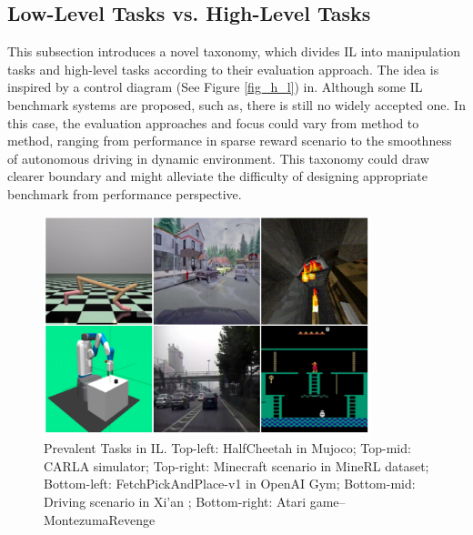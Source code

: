 \documentclass[acmsmall]{acmart}
\begin{document}
\subsection{Low-Level Tasks vs. High-Level Tasks} 
This subsection introduces a novel taxonomy, which divides IL into manipulation tasks and high-level tasks according to their evaluation approach. The idea is inspired by a control diagram (See Figure \ref{fig_h_l}) in\cite{osaAlgorithmicPerspectiveImitation2018}. Although some IL benchmark systems are proposed, such as\cite{lemmeOpensourceBenchmarkingLearned2015}, there is still no widely accepted one. In this case, the evaluation approaches and focus could vary from method to method, ranging from performance in sparse reward scenario to the smoothness of autonomous driving in dynamic environment.
This taxonomy could draw clearer boundary and might alleviate the difficulty of designing appropriate benchmark from performance perspective.
\begin{figure}[t]
      \centering
      \includegraphics[width=0.85\textwidth]{tasks.png}
      \caption{Prevalent Tasks in IL. Top-left: HalfCheetah in Mujoco; Top-mid: CARLA simulator; Top-right: Minecraft scenario in MineRL dataset; Bottom-left: FetchPickAndPlace-v1 in OpenAI Gym; Bottom-mid: Driving scenario in Xi'an \protect\cite{zhouModelingCarFollowingBehaviors2020}; Bottom-right: Atari game--MontezumaRevenge}
      \label{fig_task}
\end{figure}
\end{document}
